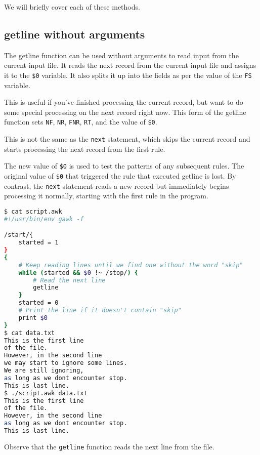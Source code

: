 We will briefly cover each of these methods.

\subsection{getline without arguments}

The getline function can be used without arguments to read input from the current input file.
It reads the next record from the current input file and assigns it to the \lstinline|$0| variable.
It also splits it up into the fields as per the value of the \lstinline|FS| variable.

This is useful if you've finished processing the current record,
but want to do some special processing on the next record right now.
This form of the getline function sets \lstinline|NF|, \lstinline|NR|, \lstinline|FNR|, \lstinline|RT|, and the value of \lstinline|$0|.

This is not the same as the \lstinline|next| statement,
which skips the current record and starts processing the next record from the first rule.

\begin{remark}
The new value of \lstinline|$0| is used to test the patterns of any subsequent rules.
The original value of \lstinline|$0| that triggered the rule that executed getline is lost.
By contrast, the \lstinline|next| statement reads a new record but immediately begins processing it normally,
starting with the first rule in the program. 
\end{remark}

\begin{lstlisting}[language=bash]
$ cat script.awk
#!/usr/bin/env gawk -f

/start/{
    started = 1
}
{
    # Keep reading lines until we find one without the word "skip"
    while (started && $0 !~ /stop/) {
        # Read the next line
        getline
    }
    started = 0
    # Print the line if it doesn't contain "skip"
    print $0
}
$ cat data.txt
This is the first line
of the file.
However, in the second line
we may start to ignore some lines.
We are still ignoring,
as long as we dont encounter stop.
This is last line.
$ ./script.awk data.txt
This is the first line
of the file.
However, in the second line
as long as we dont encounter stop.
This is last line.
\end{lstlisting}

Observe that the \lstinline|getline| function reads the next line from the file.

